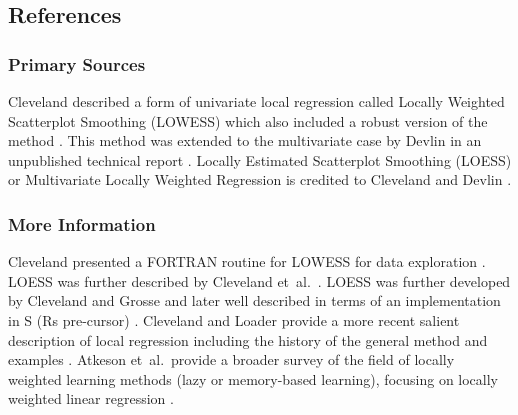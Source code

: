 \subsection{References}

\subsubsection{Primary Sources}
Cleveland described a form of univariate local regression called Locally Weighted Scatterplot Smoothing (LOWESS) which also included a robust version of the method \cite{Cleveland1978, Cleveland1979}. 
This method was extended to the multivariate case by Devlin in an unpublished technical report \cite{Devlin1986}.
Locally Estimated Scatterplot Smoothing (LOESS) or Multivariate Locally Weighted Regression is credited to Cleveland and Devlin \cite{Cleveland1988}.

\subsubsection{More Information}
Cleveland presented a FORTRAN routine for LOWESS for data exploration \cite{Cleveland1981}.
LOESS was further described by Cleveland et~al.\ \cite{Cleveland1988a}.
LOESS was further developed by Cleveland and Grosse \cite{Cleveland1991} and later well described in terms of an implementation in S (Rs pre-cursor) \cite{Cleveland1992}.
Cleveland and Loader provide a more recent salient description of local regression including the history of the general method and examples \cite{Cleveland1996}.
Atkeson et~al.\ provide a broader survey of the field of locally weighted learning methods (lazy or memory-based learning), focusing on locally weighted linear regression \cite{Atkeson1997}.

